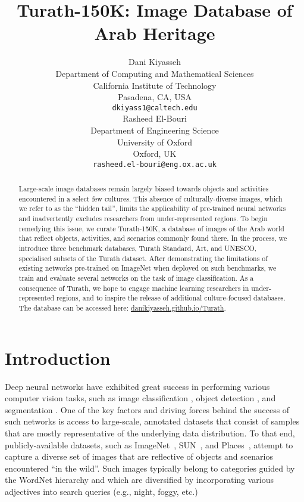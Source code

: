 \documentclass{article}
\title{Turath-150K: Image Database of Arab Heritage}
\author{%
  Dani Kiyasseh\\
  Department of Computing and Mathematical Sciences\\
  California Institute of Technology\\
  Pasadena, CA, USA\\
  \texttt{dkiyass1@caltech.edu} \\
   \And
  Rasheed El-Bouri\\
  Department of Engineering Science\\
  University of Oxford\\
  Oxford, UK\\
  \texttt{rasheed.el-bouri@eng.ox.ac.uk} \\
}
\begin{document}
\maketitle

\begin{abstract}

Large-scale image databases remain largely biased towards objects and activities encountered in a select few cultures. This absence of culturally-diverse images, which we refer to as the \enquote{hidden tail}, limits the applicability of pre-trained neural networks and inadvertently excludes researchers from under-represented regions. To begin remedying this issue, we curate Turath-150K, a database of images of the Arab world that reflect objects, activities, and scenarios commonly found there. In the process, we introduce three benchmark databases, Turath Standard, Art, and UNESCO, specialised subsets of the Turath dataset. After demonstrating the limitations of existing networks pre-trained on ImageNet when deployed on such benchmarks, we train and evaluate several networks on the task of image classification. As a consequence of Turath, we hope to engage machine learning researchers in under-represented regions, and to inspire the release of additional culture-focused databases. The database can be accessed here: \url{danikiyasseh.github.io/Turath}.

\end{abstract}

\section{Introduction}
Deep neural networks have exhibited great success in performing various computer vision tasks, such as image classification \cite{Iandola2016}, object detection \cite{Ren2015}, and segmentation \cite{Chen2017}. One of the key factors and driving forces behind the success of such networks is access to large-scale, annotated datasets that consist of samples that are mostly representative of the underlying data distribution. To that end, publicly-available datasets, such as ImageNet~\cite{deng2009imagenet}, SUN~\cite{xiao2010sun}, and Places~\cite{zhou2017places}, attempt to capture a diverse set of images that are reflective of objects and scenarios encountered \enquote{in the wild}. Such images typically belong to categories guided by the WordNet hierarchy \cite{Fellbaum2010} and which are diversified by incorporating various adjectives into search queries (e.g., night, foggy, etc.)
\end{document}
